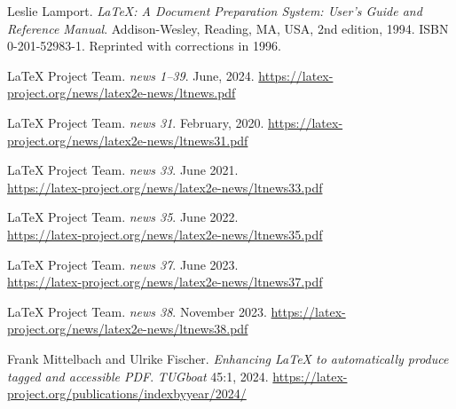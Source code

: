 \documentclass{ltnews}
\providecommand\Dash {\unskip \textemdash}
\begin{document}
\begin{thebibliography}{9}\frenchspacing



Leslie Lamport.
\newblock \emph{{\LaTeX}: {A} Document Preparation System: User's Guide and Reference
  Manual}.
\newblock \mbox{Addison}-Wesley, Reading, MA, USA, 2nd edition, 1994.
\newblock ISBN 0-201-52983-1.
\newblock Reprinted with corrections in 1996.

 \LaTeX{} Project Team.
  \emph{\LaTeXe{} news 1--39}. June, 2024.
  \url{https://latex-project.org/news/latex2e-news/ltnews.pdf}

 \LaTeX{} Project Team.
  \emph{\LaTeXe{} news 31}. February, 2020.
  \url{https://latex-project.org/news/latex2e-news/ltnews31.pdf}

 \LaTeX{} Project Team.
  \emph{\LaTeXe{} news 33}. June 2021.\\
  \url{https://latex-project.org/news/latex2e-news/ltnews33.pdf}

 \LaTeX{} Project Team.
  \emph{\LaTeXe{} news 35}. June 2022.\\
  \url{https://latex-project.org/news/latex2e-news/ltnews35.pdf}

 \LaTeX{} Project Team.
  \emph{\LaTeXe{} news 37}. June 2023.\\
  \url{https://latex-project.org/news/latex2e-news/ltnews37.pdf}

 \LaTeX{} Project Team.
  \emph{\LaTeXe{} news 38}. November 2023.
  \url{https://latex-project.org/news/latex2e-news/ltnews38.pdf}

 Frank Mittelbach and Ulrike Fischer.
  \emph{Enhancing \LaTeX{} to automatically produce
  tagged and accessible PDF}. \textsl{TUGboat} 45:1, 2024.
  \url{https://latex-project.org/publications/indexbyyear/2024/}


\end{thebibliography}
\end{document}
